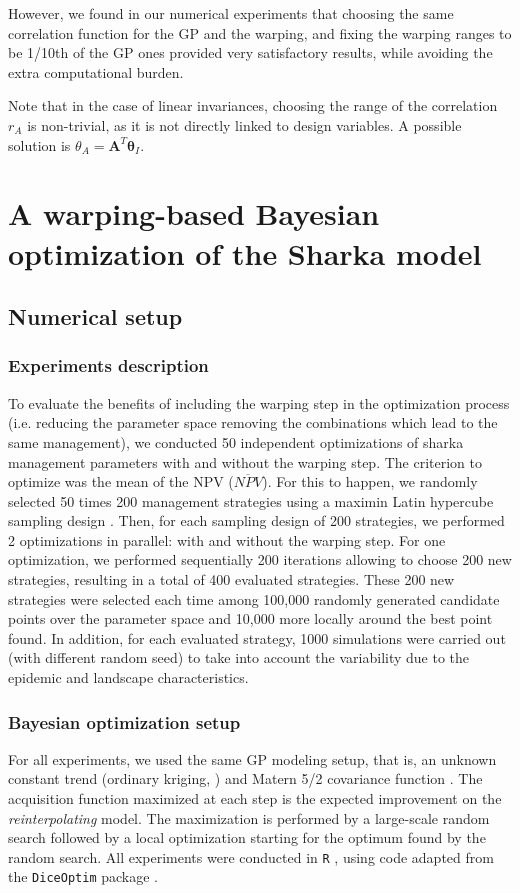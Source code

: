 However, we found in our numerical experiments that choosing the same correlation function for the GP and the warping, and fixing 
the warping ranges to be 1/10th of the GP ones provided very satisfactory results, while avoiding the extra computational burden.

Note that in the case of linear invariances, choosing the range of the correlation $r_A$ is non-trivial, as it is not directly linked to design variables. 
A possible solution is $\theta_A = \mathbf{A}^T \boldsymbol{\theta}_I$.

\section{A warping-based Bayesian optimization of the Sharka model}

\subsection{Numerical setup}

\subsubsection{Experiments description}

To evaluate the benefits of including the warping step in the optimization process (i.e. reducing the parameter space removing the combinations which lead to the same management), 
we conducted 50 independent optimizations of sharka management parameters with and without the warping step. The criterion to optimize was the mean of the NPV ($\overline{NPV}$).
For this to happen, we randomly selected 50 times 200 management strategies using a maximin Latin hypercube sampling design \cite{fang2005design}. 
Then, for each sampling design of 200 strategies, we performed 2 optimizations in parallel: with and without the warping step. 
For one optimization, we performed sequentially 200 iterations allowing to choose 200 new strategies, resulting in a total of 400 evaluated strategies.
These 200 new strategies were selected each time among 100,000 randomly generated candidate points over the parameter space and 10,000 more locally around the best point found. 
In addition, for each evaluated strategy, 1000 simulations were carried out (with different random seed) to take into account the variability due to the epidemic and landscape characteristics.

\subsubsection{Bayesian optimization setup}
For all experiments, we used the same GP modeling setup, that is, an unknown constant trend (ordinary kriging, \cite{matheron1963principles}) and 
Matern 5/2 covariance function \cite[][Chapter 4]{Rasmussen2006}. The acquisition function maximized at each step is the expected improvement on the 
\textit{reinterpolating} model. The maximization is performed by a large-scale random search followed by a local optimization starting for the optimum found by the random search.
All experiments were conducted in \texttt{R} \cite{R2018}, using code adapted from the \texttt{DiceOptim} package \cite{picheny2014noisy}.

